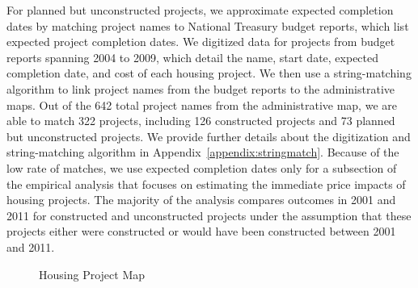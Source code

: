 \documentclass[12pt]{article}
\begin{document}
For planned but unconstructed projects, we approximate expected completion dates by matching project names to National Treasury budget reports, which list expected project completion dates.  We digitized data for projects from budget reports spanning 2004 to 2009, which detail the name, start date, expected completion date, and cost of each housing project.  We then use a string-matching algorithm to link project names from the budget reports to the administrative maps.  Out of the 642 total project names from the administrative map, we are able to match 322 projects, including 126 constructed projects and 73 planned but unconstructed projects.  We provide further details about the digitization and string-matching algorithm in Appendix~\ref{appendix:stringmatch}.  Because of the low rate of matches, we use expected completion dates only for a subsection of the empirical analysis that focuses on estimating the immediate price impacts of housing projects.  The majority of the analysis compares outcomes in 2001 and 2011 for constructed and unconstructed projects under the assumption that these projects either were constructed or would have been constructed between 2001 and 2011.



\begin{figure}[t!]
\centering
\caption{Housing Project Map}\label{figure:map}
\end{figure}
\end{document}
